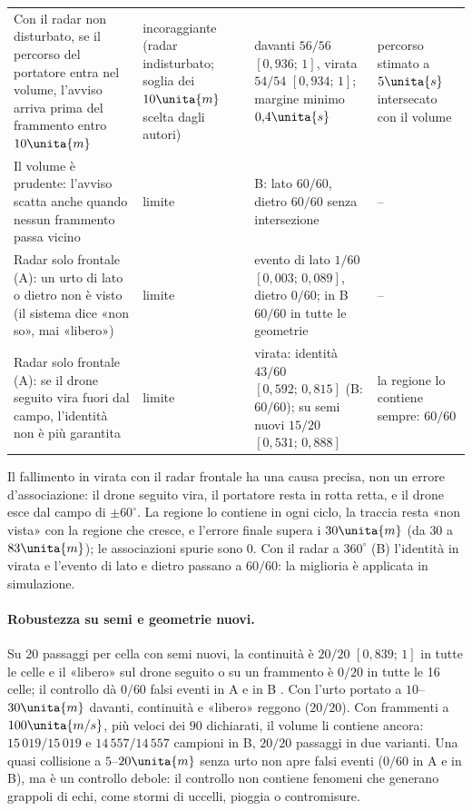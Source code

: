 \begin{table}[H]
\begin{tabularx}{\linewidth}{@{}>{\RaggedRight\arraybackslash}p{5.0cm}>{\RaggedRight\arraybackslash}p{2.0cm}>{\RaggedRight\arraybackslash}p{4.6cm}L@{}}
Con il radar non disturbato, se il percorso del portatore entra nel volume, l'avviso arriva prima del frammento entro $10\unita{m}$ & incoraggiante (radar indisturbato; soglia dei $10\unita{m}$ scelta dagli autori) & davanti $56/56$ $[0{,}936;\,1]$, virata $54/54$ $[0{,}934;\,1]$; margine minimo $0{,}4\unita{s}$ & percorso stimato a $5\unita{s}$ intersecato con il volume\\
Il volume è prudente: l'avviso scatta anche quando nessun frammento passa vicino & limite & B: lato $60/60$, dietro $60/60$ senza intersezione & --\\
Radar solo frontale (A): un urto di lato o dietro non è visto (il sistema dice «non so», mai «libero») & limite & evento di lato $1/60$ $[0{,}003;\,0{,}089]$, dietro $0/60$; in B $60/60$ in tutte le geometrie & --\\
Radar solo frontale (A): se il drone seguito vira fuori dal campo, l'identità non è più garantita & limite & virata: identità $43/60$ $[0{,}592;\,0{,}815]$ (B: $60/60$); su semi nuovi $15/20$ $[0{,}531;\,0{,}888]$ & la regione lo contiene sempre: $60/60$\\
\bottomrule
\end{tabularx}
\end{table}

Il fallimento in virata con il radar frontale ha una causa precisa, non un errore d'associazione: il drone seguito vira, il portatore resta in rotta retta, e il drone esce dal campo di $\pm60^\circ$. La regione lo contiene in ogni ciclo, la traccia resta «non vista» con la regione che cresce, e l'errore finale supera i $30\unita{m}$ (da $30$ a $83\unita{m}$); le associazioni spurie sono 0. Con il radar a $360^\circ$ (B) l'identità in virata e l'evento di lato e dietro passano a $60/60$: la miglioria è applicata in simulazione.

\paragraph{Robustezza su semi e geometrie nuovi.} Su 20 passaggi per cella con semi nuovi, la continuità è $20/20$ $[0{,}839;\,1]$ in tutte le celle e il «libero» sul drone seguito o su un frammento è $0/20$ in tutte le 16 celle; il controllo dà $0/60$ falsi eventi in A e in B . Con l'urto portato a $10$--$30\unita{m}$ davanti, continuità e «libero» reggono ($20/20$). Con frammenti a $100\unita{m/s}$, più veloci dei $90$ dichiarati, il volume li contiene ancora: $15\,019/15\,019$ e $14\,557/14\,557$ campioni in B, $20/20$ passaggi in due varianti. Una quasi collisione a $5$--$20\unita{m}$ senza urto non apre falsi eventi ($0/60$ in A e in B), ma è un controllo debole: il controllo non contiene fenomeni che generano grappoli di echi, come stormi di uccelli, pioggia o contromisure.

